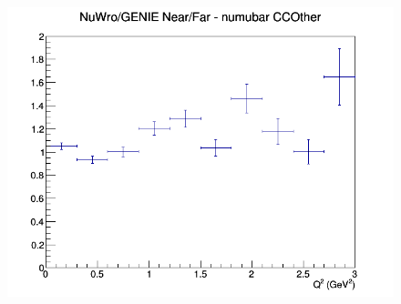 \documentclass[12pt]{article}
\begin{document}
\begin{figure}[h]
\endminipage
{}
\includegraphics[width=\linewidth]{eff_Q2/FGT/ratios/CCOther_NuWro_GENIE_numubar_NF_Q2.png}
\endminipage
\newline
\end{figure}
\clearpage
\end{document}
